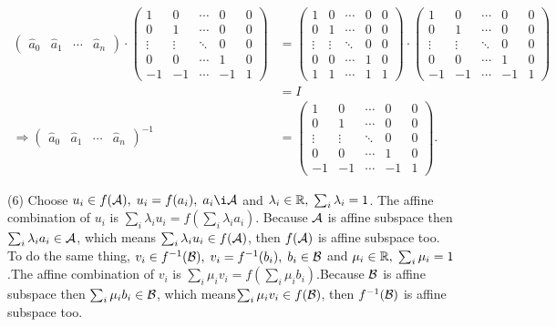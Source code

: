 \documentclass[12pt]{article}
\begin{document}
\begin{align*}
\begin{pmatrix}
\widehat{a}_0 & \widehat{a}_1 & \cdots & \widehat{a}_n   
\end{pmatrix} \cdot 
\begin{pmatrix}
1  & 0 & \cdots & 0 & 0\\
0  & 1 & \cdots & 0 & 0\\
\vdots & \vdots & \ddots & 0 & 0 \\
0  &  0  & \cdots & 1 & 0 \\
-1  &  -1  & \cdots & -1 & 1
\end{pmatrix} &= 
\begin{pmatrix}
1  & 0 & \cdots & 0 & 0 \\
0  & 1 & \cdots & 0 & 0\\
\vdots & \vdots & \ddots & 0 & 0 \\
0  &  0  & \cdots & 1 & 0 \\
1  &  1  & \cdots & 1 & 1
\end{pmatrix} \cdot
\begin{pmatrix}
1  & 0 & \cdots & 0 & 0\\
0  & 1 & \cdots & 0 & 0\\
\vdots & \vdots & \ddots & 0 & 0 \\
0  &  0  & \cdots & 1 & 0 \\
-1  &  -1  & \cdots & -1 & 1
\end{pmatrix} \\
&= I \\
\Rightarrow 
\begin{pmatrix}
\widehat{a}_0 & \widehat{a}_1 & \cdots & \widehat{a}_n   
\end{pmatrix}^{-1} &=
\begin{pmatrix}
1  & 0 & \cdots & 0 & 0\\
0  & 1 & \cdots & 0 & 0\\
\vdots & \vdots & \ddots & 0 & 0 \\
0  &  0  & \cdots & 1 & 0 \\
-1  &  -1  & \cdots & -1 & 1
\end{pmatrix} .
\end{align*}

\medskip
(6)
Choose $u_i \in f(\s{A}), \; u_i = f(a_i), \; a_i \i \s{A}$ and $\lambda_i \in \mathbb{R}, \; \sum_i \lambda_i = 1$. The affine combination of $u_i$ is $\sum_i \lambda_i u_i = f(\sum_i \lambda_i a_i)$. Because ${\cal A}$ is affine subspace then $\sum_i \lambda_i a_i \in {\cal A}$, which means $\sum_i \lambda_i u_i \in f({\cal A})$, then $f({\cal A})$ is affine subspace too. \\
To do the same thing, $v_i \in f^{-1}({\cal B}), \; v_i = f^{-1}(b_i), \; b_i \in {\cal B}$ and $\mu_i \in \mathbb{R}, \; \sum_i \mu_i = 1$.The affine combination of $v_i$ is $\sum_i \mu_i v_i = f(\sum_i \mu_i b_i)$.Because ${\cal B}$ is affine subspace then $\sum_i \mu_i b_i \in {\cal B}$, which means$\sum_i \mu_i v_i \in f({\cal B})$, then $f^{-1}({\cal B})$ is affine subspace too.
\end{document}
